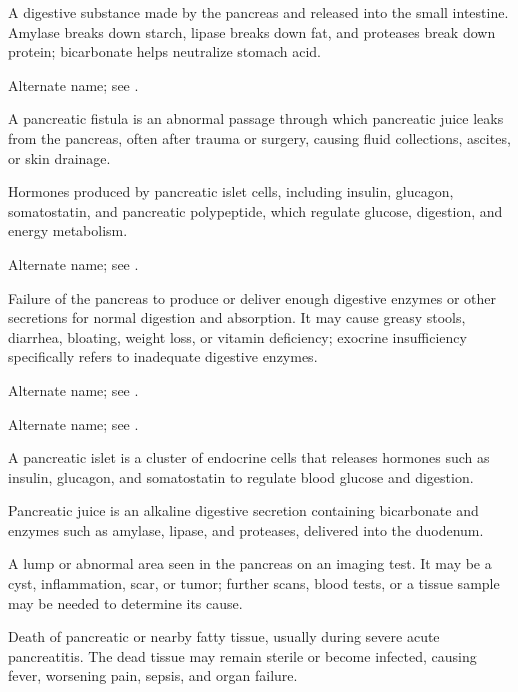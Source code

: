  A digestive substance made by the pancreas and released into the small intestine. Amylase breaks down starch, lipase breaks down fat, and proteases break down protein; bicarbonate helps neutralize stomach acid.

 Alternate name; see .

 A pancreatic fistula is an abnormal passage through which pancreatic juice leaks from the pancreas, often after trauma or surgery, causing fluid collections, ascites, or skin drainage.

 Hormones produced by pancreatic islet cells, including insulin, glucagon, somatostatin, and pancreatic polypeptide, which regulate glucose, digestion, and energy metabolism.

 Alternate name; see .

 Failure of the pancreas to produce or deliver enough digestive enzymes or other secretions for normal digestion and absorption. It may cause greasy stools, diarrhea, bloating, weight loss, or vitamin deficiency; exocrine insufficiency specifically refers to inadequate digestive enzymes.

 Alternate name; see .

 Alternate name; see .

 A pancreatic islet is a cluster of endocrine cells that releases hormones such as insulin, glucagon, and somatostatin to regulate blood glucose and digestion.

 Pancreatic juice is an alkaline digestive secretion containing bicarbonate and enzymes such as amylase, lipase, and proteases, delivered into the duodenum.

 A lump or abnormal area seen in the pancreas on an imaging test. It may be a cyst, inflammation, scar, or tumor; further scans, blood tests, or a tissue sample may be needed to determine its cause.

 Death of pancreatic or nearby fatty tissue, usually during severe acute pancreatitis. The dead tissue may remain sterile or become infected, causing fever, worsening pain, sepsis, and organ failure.


